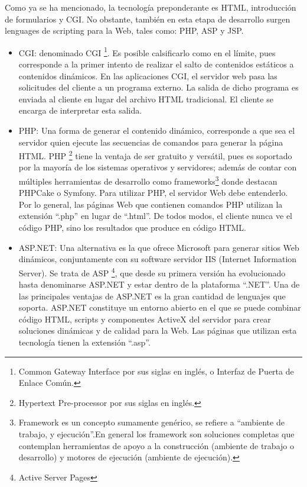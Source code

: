 Como ya se ha mencionado, la tecnología preponderante es HTML, introducción de formularios y CGI. No obstante, también en esta 
etapa de desarrollo surgen lenguages de scripting para la Web, tales como: PHP, ASP y JSP.  

\begin{itemize}
 \item CGI: denominado CGI \footnote{Common Gateway Interface por sus siglas en inglés, o 
	    Interfaz de Puerta de Enlace Común.}. Es posible calsificarlo como en el límite, pues corresponde a la primer intento de 
	    realizar el salto de contenidos estáticos a contenidos dinámicos. En las aplicaciones 
	    CGI, el servidor web pasa las solicitudes del cliente a un programa externo.  La salida de dicho programa es enviada al cliente 
	    en lugar del archivo HTML tradicional. El cliente se encarga de interpretar esta salida.
	    
 \item PHP: Una forma de generar el contenido dinámico, corresponde a que sea el servidor quien ejecute las secuencias de comandos para
	    generar la página HTML. PHP \footnote{Hypertext Pre-processor por sus siglas en inglés.}  tiene la ventaja de ser gratuito y 
	    versátil, pues es soportado por la mayoría de los sistemas operativos y servidores; además de contar con múltiples herramientas
	    de desarrollo como frameworks\footnote{Framework es un concepto sumamente genérico, se refiere a “ambiente de trabajo, 
	    y ejecución”.En general los framework son soluciones completas que contemplan herramientas de apoyo a la construcción 
	    (ambiente de trabajo o desarrollo) y motores de ejecución (ambiente de ejecución).} donde destacan PHPCake o Symfony. 
	    Para utilizar PHP, el servidor Web debe entenderlo. Por lo general, las páginas Web que contienen comandos PHP utilizan la
	    extensión “.php” en lugar de “.html”. De todos modos, el cliente nunca ve el código PHP, sino los resultados que produce
	    en código HTML.

 \item ASP.NET: Una alternativa es la que ofrece Microsoft para generar sitios Web dinámicos, conjuntamente con su software servidor
		IIS (Internet Information Server). Se trata de ASP \footnote{Active Server Pages}, que desde su primera versión ha 
		evolucionado hasta denominarse ASP.NET y estar dentro de la plataforma “.NET”.
		Una de las principales ventajas de ASP.NET es la gran cantidad de lenguajes que soporta. ASP.NET constituye un 
		entorno abierto en el que se puede combinar código HTML, scripts y componentes ActiveX del servidor para crear 
		soluciones dinámicas y de calidad para la Web. Las páginas que utilizan esta tecnología tienen la extensión “.asp”.
\end{itemize}


